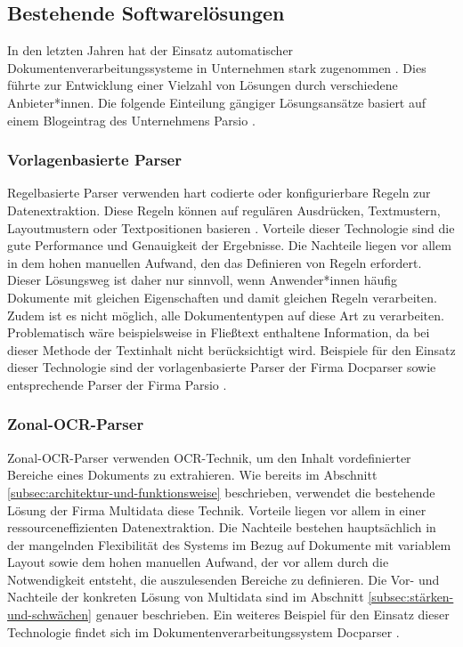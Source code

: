 \subsection{Bestehende Softwarelösungen}
\label{subsec:bestehende-softwarelösungen}

In den letzten Jahren hat der Einsatz automatischer Dokumentenverarbeitungssysteme in Unternehmen stark zugenommen \parencite{PerotVincent2024LLMD}. Dies führte zur Entwicklung einer Vielzahl von Lösungen durch verschiedene Anbieter*innen. Die folgende Einteilung gängiger Lösungsansätze basiert auf einem Blogeintrag des Unternehmens Parsio \parencite{parsio_pdf_extraction}.

\subsubsection{Vorlagenbasierte Parser}
\label{subsubsec:regelbasierte-ansätze}

Regelbasierte Parser verwenden hart codierte oder konfigurierbare Regeln zur Datenextraktion. Diese Regeln können auf regulären Ausdrücken, Textmustern, Layoutmustern oder Textpositionen basieren \parencite{docparser_ruleBasedParsing}. Vorteile dieser Technologie sind die gute Performance und Genauigkeit der Ergebnisse. Die Nachteile liegen vor allem in dem hohen manuellen Aufwand, den das Definieren von Regeln erfordert. Dieser Lösungsweg ist daher nur sinnvoll, wenn Anwender*innen häufig Dokumente mit gleichen Eigenschaften und damit gleichen Regeln verarbeiten. Zudem ist es nicht möglich, alle Dokumententypen auf diese Art zu verarbeiten. Problematisch wäre beispielsweise in Fließtext enthaltene Information, da bei dieser Methode der Textinhalt nicht berücksichtigt wird. Beispiele für den Einsatz dieser Technologie sind der vorlagenbasierte Parser der Firma Docparser \parencite{docparser_ruleBasedParsing} sowie entsprechende Parser der Firma Parsio \parencite{parsio_pdf_extraction}.

\subsubsection{Zonal-OCR-Parser}
\label{subsubsec:zonal-ocr-parser}

Zonal-\gls{OCR}-Parser verwenden \gls{OCR}-Technik, um den Inhalt vordefinierter Bereiche eines Dokuments zu extrahieren. Wie bereits im Abschnitt \ref{subsec:architektur-und-funktionsweise} beschrieben, verwendet die bestehende Lösung der Firma Multidata diese Technik. Vorteile liegen vor allem in einer ressourceneffizienten Datenextraktion. Die Nachteile bestehen hauptsächlich in der mangelnden Flexibilität des Systems im Bezug auf Dokumente mit variablem Layout sowie dem hohen manuellen Aufwand, der vor allem durch die Notwendigkeit entsteht, die auszulesenden Bereiche zu definieren. Die Vor- und Nachteile der konkreten Lösung von Multidata sind im Abschnitt \ref{subsec:stärken-und-schwächen} genauer beschrieben. Ein weiteres Beispiel für den Einsatz dieser Technologie findet sich im Dokumentenverarbeitungssystem Docparser \parencite{docparser_zonalOCR}.

